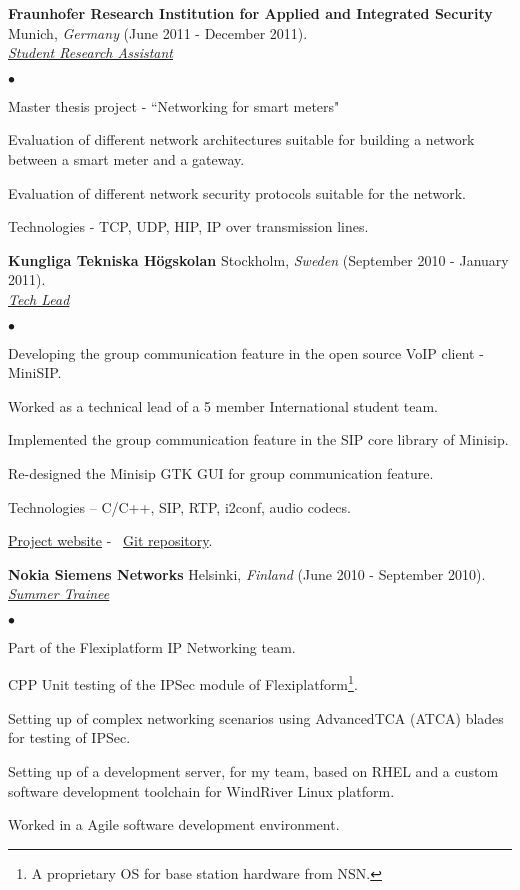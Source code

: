 \documentclass[a4paper]{article}
\newcommand{\employer}[4]{{ \textbf{#1} #2  (#3).\\ \underline{\emph{#4}}\\  }}
\newenvironment{achievements}{\begin{list}{$\bullet$}{\topsep 0pt \itemsep -2pt}}{\vspace*{4pt}\end{list}}
\begin{document}
\break
\employer{Fraunhofer Research Institution for Applied and Integrated Security} {Munich, \textit{Germany}} {June 2011 - December 2011}{Student Research Assistant}
	\begin{achievements}
	  \item Master thesis project - ``Networking for smart meters"
	  \item Evaluation of different network architectures suitable for building a network between a smart meter and a gateway.
	  \item Evaluation of different network security protocols suitable for the network.
          \item Technologies - TCP, UDP, HIP, IP over transmission lines.
	\end{achievements}

\employer{Kungliga Tekniska H\"{o}gskolan}{Stockholm, \textit{Sweden}}{September 2010 - January 2011}{Tech Lead}
  \begin{achievements}
    \item Developing the group communication feature in the open source VoIP client - MiniSIP.
    \item Worked as a technical lead of a 5 member International student team.
    \item Implemented the group communication feature in the SIP core library of Minisip.
    \item Re-designed the Minisip GTK GUI for group communication feature.
    \item Technologies – C/C++, SIP, RTP, i2conf, audio codecs.
    \item \href{https://archive.ssvl.kth.se/csd2010/csd.xen.ssvl.kth.se/csdlive/content/salcas.html}{Project website} - \ 
	  \href{https://github.com/dandugula/minisip_salcas}{Git repository}.
  \end{achievements}

\employer{Nokia Siemens Networks}{Helsinki, \textit{Finland}}{June 2010 - September 2010}{Summer Trainee}
	\begin{achievements}
          \item Part of the Flexiplatform IP Networking team.
	  \item CPP Unit testing of the IPSec module of Flexiplatform\footnote[1]{A proprietary OS for base station hardware from NSN.}.
	  \item Setting up of complex networking scenarios using AdvancedTCA (ATCA) blades for testing of IPSec.
	  \item Setting up of a development server, for my team, based on RHEL and a custom software development toolchain for WindRiver Linux platform.
	  \item Worked in a Agile software development environment.
	\end{achievements}
\end{document}
